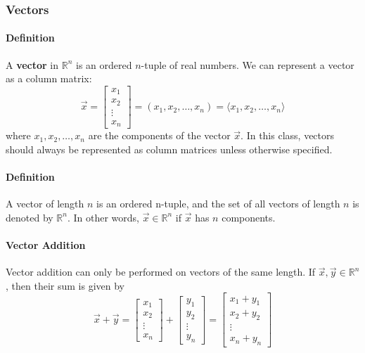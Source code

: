 \hrulefill

\subsubsection*{Vectors}
\paragraph*{Definition} A \textbf{vector} in $\mathbb{R}^n$ is an ordered $n$-tuple of real numbers. We can represent a vector as a column matrix:
\[\vec{x} = \begin{bmatrix}
    x_1 \\
    x_2 \\
    \vdots \\
    x_n
\end{bmatrix} = (x_1, x_2, \ldots, x_n) = \langle x_1, x_2, \ldots, x_n \rangle\]
where $x_1, x_2, \ldots, x_n$ are the components of the vector $\vec{x}$. In this class, vectors should always be 
represented as column matrices unless otherwise specified.

\paragraph*{Definition} A vector of length $n$ is an ordered n-tuple, and the set of all vectors of length $n$ is denoted by $\mathbb{R}^n$.
In other words, $\vec{x} \in \mathbb{R}^n$ if $\vec{x}$ has $n$ components.

\paragraph*{Vector Addition} Vector addition can only be performed on vectors of the same length. If $\vec{x}, \vec{y} \in \mathbb{R}^n$, then their sum is given by
\[\vec{x} + \vec{y} = \begin{bmatrix}
    x_1 \\
    x_2 \\
    \vdots \\
    x_n
\end{bmatrix} + \begin{bmatrix}
    y_1 \\
    y_2 \\
    \vdots \\
    y_n
\end{bmatrix} = \begin{bmatrix}
    x_1 + y_1 \\
    x_2 + y_2 \\
    \vdots \\
    x_n + y_n
\end{bmatrix}\]

